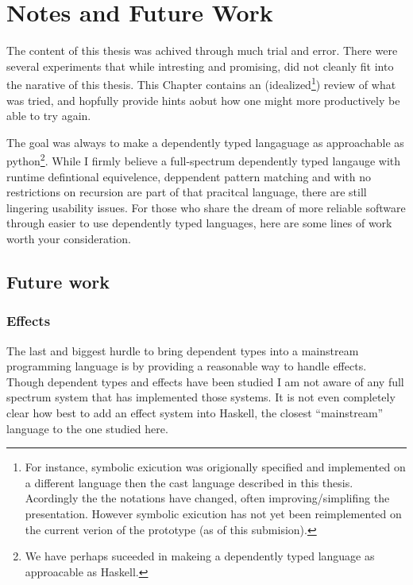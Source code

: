 \chapter{Notes and Future Work}
\label{chapter:Notes}
\thispagestyle{myheadings}

The content of this thesis was achived through much trial and error.
There were several experiments that while intresting and promising, did not cleanly fit into the narative of this thesis.
This Chapter contains an (idealized\footnote{
  For instance, symbolic exicution was origionally specified and implemented on a different language then the cast language described in this thesis.
  Acordingly the the notations have changed, often improving/simplifing the presentation.
  However symbolic exicution has not yet been reimplemented on the current verion of the prototype (as of this submision).
}) review of what was tried, and hopfully provide hints aobut how one might more productively be able to try again.

The goal was always to make a dependently typed langaguage as approachable as python\footnote{We have perhaps suceeded in makeing a dependently typed language as approacable as Haskell.}.
While I firmly believe a full-spectrum dependently typed langauge with runtime defintional equivelence, deppendent pattern matching and with no restrictions on recursion are part of that pracitcal language, there are still lingering usability issues.
For those who share the dream of more reliable software through easier to use dependently typed languages, here are some lines of work worth your consideration.

 


\section{Future work}


\subsection{Effects}

The last and biggest hurdle to bring dependent types into a mainstream programming language is by providing a reasonable way to handle effects.
Though dependent types and effects have been studied I am not aware of any full spectrum system that has implemented those systems.
It is not even completely clear how best to add an effect system into Haskell, the closest ``mainstream'' language to the one studied here.

